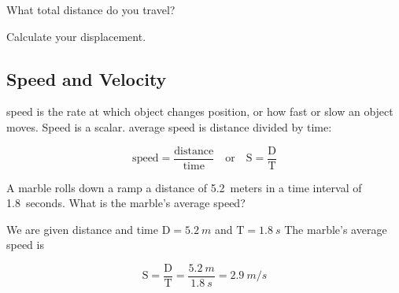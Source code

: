 \documentclass[main.tex]{subfiles}
\begin{document}
\begin{center}
\end{center}

\begin{exercise} \label{raIRVr}
    What total distance do you travel?
\end{exercise}

\begin{exercise} \label{Dxhphh}
    Calculate your displacement.
\end{exercise}

\cyanhrule

\subsection{Speed and Velocity} \label{nqhUSe}

\Gls{speed} is the rate at which object changes position, or how fast or slow an object moves. Speed is a scalar. \Gls{average speed} is distance divided by time:

\begin{equation} \label{Sni2AA}
    \mathrm{speed = \frac{distance}{time}} \hspace{1em}
    \text{or} \hspace{1em}
    \mathrm{S = \frac{D}{T}}
\end{equation}


\begin{example}
A marble rolls down a ramp a distance of \SI{5.2}{meters} in a time interval of \SI{1.8}{seconds}. What is the marble's average speed?
\end{example}

\Solution We are given distance and time $\mathrm{D} = \SI{5.2}{m}$ and $\mathrm{T} = \SI{1.8}{s}$ The marble's average speed is

\begin{equation*}
    \mathrm{S = \frac{D}{T}} = \frac{\SI{5.2}{m}}{\SI{1.8}{s}} = \SI{2.9}{m/s}
\end{equation*}
\end{document}
